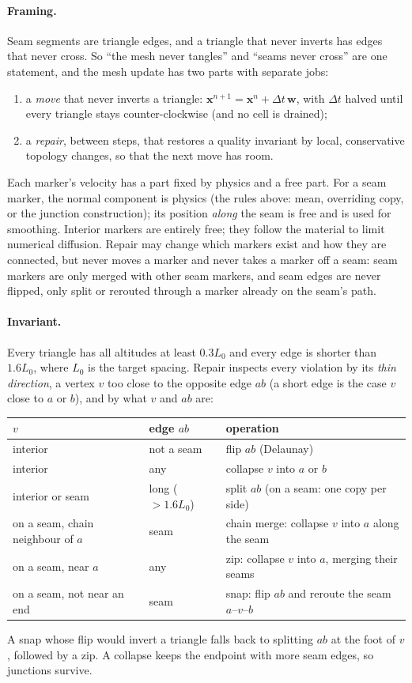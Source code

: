 \documentclass[11pt]{article}
\newcommand{\vect}[1]{\mathbf{#1}}
\begin{document}
\paragraph{Framing.} Seam segments are triangle edges, and a triangle that never inverts has edges that never cross. So ``the mesh never tangles'' and ``seams never cross'' are one statement, and the mesh update has two parts with separate jobs:
\begin{enumerate}
\item a \emph{move} that never inverts a triangle: $\vect{x}^{n+1}=\vect{x}^n+\Delta t\,\vect{w}$, with $\Delta t$ halved until every triangle stays counter-clockwise (and no cell is drained);
\item a \emph{repair}, between steps, that restores a quality invariant by local, conservative topology changes, so that the next move has room.
\end{enumerate}
Each marker's velocity has a part fixed by physics and a free part. For a seam marker, the normal component is physics (the rules above: mean, overriding copy, or the junction construction); its position \emph{along} the seam is free and is used for smoothing. Interior markers are entirely free; they follow the material to limit numerical diffusion. Repair may change which markers exist and how they are connected, but never moves a marker and never takes a marker off a seam: seam markers are only merged with other seam markers, and seam edges are never flipped, only split or rerouted through a marker already on the seam's path.

\paragraph{Invariant.} Every triangle has all altitudes at least $0.3L_0$ and every edge is shorter than $1.6L_0$, where $L_0$ is the target spacing. Repair inspects every violation by its \emph{thin direction}, a vertex $v$ too close to the opposite edge $ab$ (a short edge is the case $v$ close to $a$ or $b$), and by what $v$ and $ab$ are:
\begin{center}
\begin{tabular}{@{}lll@{}}
\toprule
$v$ & edge $ab$ & operation\\
\midrule
interior & not a seam & flip $ab$ (Delaunay)\\
interior & any & collapse $v$ into $a$ or $b$\\
interior or seam & long ($>1.6L_0$) & split $ab$ (on a seam: one copy per side)\\
on a seam, chain neighbour of $a$ & seam & chain merge: collapse $v$ into $a$ along the seam\\
on a seam, near $a$ & any & zip: collapse $v$ into $a$, merging their seams\\
on a seam, not near an end & seam & snap: flip $ab$ and reroute the seam $a$--$v$--$b$\\
\bottomrule
\end{tabular}
\end{center}
A snap whose flip would invert a triangle falls back to splitting $ab$ at the foot of $v$, followed by a zip. A collapse keeps the endpoint with more seam edges, so junctions survive.
\end{document}
